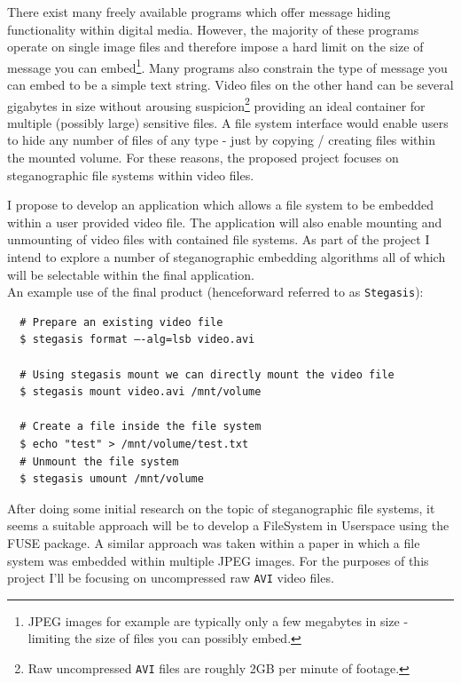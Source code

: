 \documentclass[paper=a4, fontsize=11pt,twoside]{scrartcl}    %
\numberwithin{table}{section}
\numberwithin{figure}{section}
\numberwithin{algorithm}{section}
\begin{document}
There exist many freely available programs which offer message hiding functionality within digital media. However, the majority of these programs operate on single image files and therefore impose a hard limit on the size of message you can embed\footnote{JPEG images for example are typically only a few megabytes in size - limiting the size of files you can possibly embed.}. Many programs also constrain the type of message you can embed to be a simple text string. Video files on the other hand can be several gigabytes in size without arousing suspicion\footnote{Raw uncompressed \texttt{AVI} files are roughly 2GB per minute of footage.} providing an ideal container for multiple (possibly large) sensitive files. A file system interface would enable users to hide any number of files of any type - just by copying / creating files within the mounted volume. For these reasons, the proposed project focuses on steganographic file systems within video files.

I propose to develop an application which allows a file system to be embedded within a user provided video file. The application will also enable mounting and unmounting of video files with contained file systems. As part of the project I intend to explore a number of steganographic embedding algorithms all of which will be selectable within the final application.\\

\noindent
An example use of the final product (henceforward referred to as \texttt{Stegasis}):
\begin{verbatim}
  # Prepare an existing video file
  $ stegasis format –-alg=lsb video.avi
     
  # Using stegasis mount we can directly mount the video file
  $ stegasis mount video.avi /mnt/volume
 
  # Create a file inside the file system
  $ echo "test" > /mnt/volume/test.txt
  # Unmount the file system
  $ stegasis umount /mnt/volume
\end{verbatim}
 
After doing some initial research on the topic of steganographic file systems, it seems a suitable approach will be to develop a FileSystem in Userspace using the FUSE package. A similar approach was taken within a paper in which a file system was embedded within multiple JPEG images. For the purposes of this project I'll be focusing on uncompressed raw \texttt{AVI} video files.
 
\end{document}
